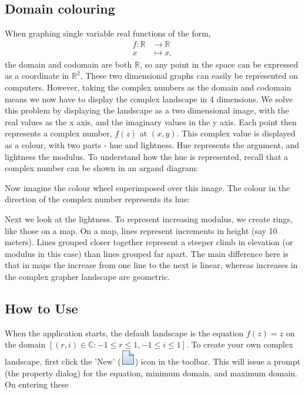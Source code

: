 \documentclass{article}
\newcommand{\R}{\ensuremath{\mathbb{R}}} %
\newcommand{\C}{\ensuremath{\mathbb{C}}} %
\begin{document}
		\subsection{Domain colouring}
			When graphing single variable real functions of the form, \begin{align*}
				f : \R &\to \R\\
				 x &\mapsto x,
			\end{align*} the domain and codomain are both $\R$, so any point in the space can be expressed as a coordinate in $\R^2$. These two dimensional graphs can 
			easily be represented on computers. However, taking the complex numbers as the domain and codomain means we now have to display the complex landscape
			in 4 dimensions. We solve this problem by displaying the landscape as a two dimensional image, with the real values as the x axis, and the imaginary values in 
			the y axis. Each point then represents a complex number, $f(z)$ at $(x,y)$. This complex value is displayed as a colour, with two parts - hue and lightness. Hue 
			represents the argument, and lightness the modulus. To understand how the hue is represented, recall that a complex number can be shown in an argand diagram:
			
			
			Now imagine the colour wheel superimposed over this image. The colour in the direction of the complex number represents its hue:
			
			
			Next we look at the lightness. To represent increasing modulus, we create rings, like those on a map. On a map, lines represent increments in height (say 10 meters).
			Lines grouped closer together represent a steeper climb in elevation (or modulus in this case) than lines grouped far apart. The main difference here is that in maps
			the increase from one line to the next is linear, whereas increases in the complex grapher landscape are geometric.
		
		\subsection{How to Use}
			When the application starts, the default landscape is the equation $f(z) = z$ on the domain $[(r,i)\in\C : -1 \leq r \leq 1, -1 \leq i \leq 1]$. To create your own complex landscape, first click the 'New' (\includegraphics[height=\fontcharht\font`\B]{../src/resources/toolbar/new}) icon in the toolbar. This will issue a prompt (the property dialog) for the equation, minimum domain, and maximum domain. On entering these 
			
\end{document}
